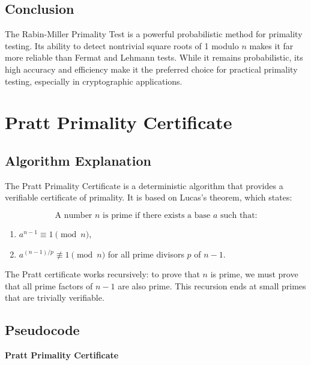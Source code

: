 \documentclass[12pt]{article}
\begin{document}
\subsection*{Conclusion}

The Rabin-Miller Primality Test is a powerful probabilistic method for primality testing. Its ability to detect nontrivial square roots of 1 modulo \( n \) makes it far more reliable than Fermat and Lehmann tests. While it remains probabilistic, its high accuracy and efficiency make it the preferred choice for practical primality testing, especially in cryptographic applications.

\section{Pratt Primality Certificate}

\subsection*{Algorithm Explanation}

The Pratt Primality Certificate is a deterministic algorithm that provides a verifiable certificate of primality. It is based on Lucas's theorem, which states:

\[
\text{A number } n \text{ is prime if there exists a base } a \text{ such that:}
\]
\begin{enumerate}
    \item \( a^{n-1} \equiv 1 \pmod{n} \),
    \item \( a^{(n-1)/p} \not\equiv 1 \pmod{n} \) for all prime divisors \( p \) of \( n-1 \).
\end{enumerate}

The Pratt certificate works recursively: to prove that \( n \) is prime, we must prove that all prime factors of \( n-1 \) are also prime. This recursion ends at small primes that are trivially verifiable.

\subsection*{Pseudocode}

\textbf{Pratt Primality Certificate}

\end{document}
